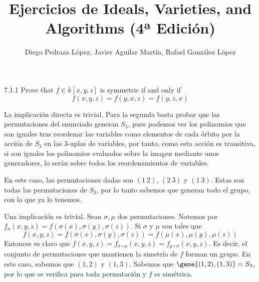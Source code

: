 \documentclass[twoside]{article}
\begin{document}
\title{Ejercicios de Ideals, Varieties, and Algorithms (4ª Edición)}
\author{Diego Pedraza López, Javier Aguilar Martín, Rafael González López}
\maketitle

\begin{ejercicio}{7.1.1}
Prove that $f ∈ k[x, y, z]$ is symmetric if and only if $$f (x, y, z)= f (y, x, z) = f (y, z, x)$$
\end{ejercicio}
\begin{solucion}
La implicación directa es trivial. Para la segunda basta probar que las permutaciones del enunciado generan $S_3$, pues podemos ver los polinomios que son iguales tras reordenar las variables como elementos de cada órbita por la acción de $S_3$ en las 3-uplas de variables, por tanto, como esta acción es transitiva, si son iguales los polinomios evaluados sobre la imagen mediante unos generadores, lo serán sobre todos los reordenamientos de variables.

En este caso, las permutaciones dadas son $(1\ 2)$,  $(2\ 3)$ y $(1\ 3)$. Estas son todas las permutaciones de $S_3$, por lo tanto sabemos que generan todo el grupo, con lo que ya lo tenemos. 
\end{solucion}

\begin{solucion}
Una implicación es trivial. Sean $\sigma,\mu$ dos permutaciones. Notemos por $f_\sigma(x,y,z) =  f(\sigma(x),\sigma(y),\sigma(z))$. Si $\sigma$ y $\mu$ son tales que
$$f(x,y,z)=f(\sigma(x),\sigma(y),\sigma(z))=f(\mu(x),\mu(y),\mu(z))$$
Entonces es claro que $f(x,y,z)=f_{\sigma \circ \mu}(x,y,z)=f_{ \mu\circ \sigma}(x,y,z)$. Es decir, el conjunto de permutaciones que mantienen la simetría de $f$ forman un grupo. En este caso, sabemos que $(1,2)$ y $(1,3)$. Sabemos que $\gene{(1,2),(1,3)}=S_3$, por lo que se verifica para toda permutación y $f$ es simétrica.
\end{solucion}

\newpage
\end{document}
